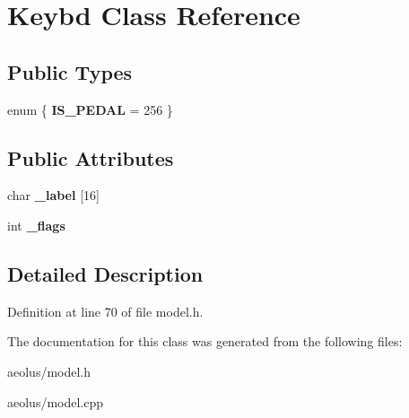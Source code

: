 \hypertarget{class_keybd}{}\section{Keybd Class Reference}
\label{class_keybd}
\subsection*{Public Types}
\begin{DoxyCompactItemize}
\item 
\mbox{\label{class_keybd_a7d80c40123fb1d0a6473d5448bb40869}} 
enum \{ {\bfseries I\+S\+\_\+\+P\+E\+D\+AL} = 256
 \}
\end{DoxyCompactItemize}
\subsection*{Public Attributes}
\begin{DoxyCompactItemize}
\item 
\mbox{\label{class_keybd_a7ff3e7f52f521dfd588ee4598e991507}} 
char {\bfseries \+\_\+label} \mbox{[}16\mbox{]}
\item 
\mbox{\label{class_keybd_ae34fc3900928647abb295ad9335ef6ee}} 
int {\bfseries \+\_\+flags}
\end{DoxyCompactItemize}


\subsection{Detailed Description}


Definition at line 70 of file model.\+h.



The documentation for this class was generated from the following files\+:\begin{DoxyCompactItemize}
\item 
aeolus/model.\+h\item 
aeolus/model.\+cpp\end{DoxyCompactItemize}
